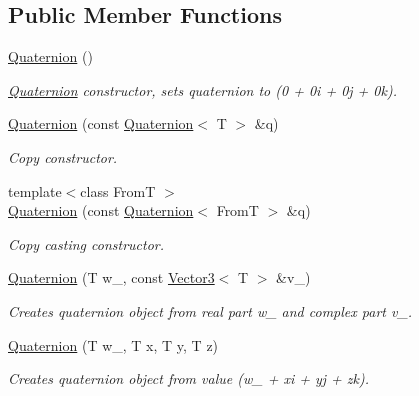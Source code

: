 \subsection*{Public Member Functions}
\begin{DoxyCompactItemize}
\item 
\hyperlink{class_quaternion_ad5008dba83ccdf61b2e66ac1bfb709f3}{Quaternion} ()
\begin{DoxyCompactList}\small\item\em \hyperlink{class_quaternion}{Quaternion} constructor, sets quaternion to (0 + 0i + 0j + 0k). \item\end{DoxyCompactList}\item 
\hyperlink{class_quaternion_a1737dd209659babb0a71b386dbb63314}{Quaternion} (const \hyperlink{class_quaternion}{Quaternion}$<$ T $>$ \&q)
\begin{DoxyCompactList}\small\item\em Copy constructor. \item\end{DoxyCompactList}\item 
{\footnotesize template$<$class FromT $>$ }\\\hyperlink{class_quaternion_a5e0472cfdc4928db4071c78b1656fe4e}{Quaternion} (const \hyperlink{class_quaternion}{Quaternion}$<$ FromT $>$ \&q)
\begin{DoxyCompactList}\small\item\em Copy casting constructor. \item\end{DoxyCompactList}\item 
\hyperlink{class_quaternion_a6a703f9bd81ff8cb1dac6e5cfebacf5a}{Quaternion} (T w\_\-, const \hyperlink{class_vector3}{Vector3}$<$ T $>$ \&v\_\-)
\begin{DoxyCompactList}\small\item\em Creates quaternion object from real part w\_\- and complex part v\_\-. \item\end{DoxyCompactList}\item 
\hyperlink{class_quaternion_a4d214b9f82b3f74dc7311f584a1eae73}{Quaternion} (T w\_\-, T x, T y, T z)
\begin{DoxyCompactList}\small\item\em Creates quaternion object from value (w\_\- + xi + yj + zk). \item\end{DoxyCompactList}\item 

\end{DoxyCompactItemize}
